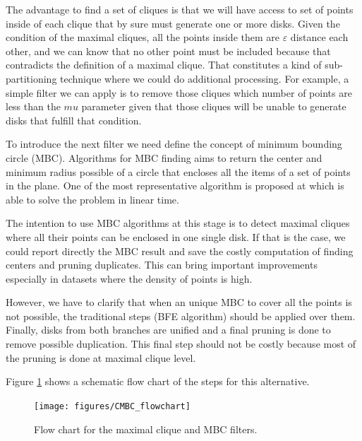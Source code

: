 \begin{itemize}
The advantage to find a set of cliques is that we will have access to set of points inside of each clique that by sure must generate one or more disks.  Given the condition of the maximal cliques, all the points inside them are $\varepsilon$ distance each other, and we can know that no other point must be included because that contradicts the definition of a maximal clique.  That constitutes a kind of sub-partitioning technique where we could do additional processing. For example, a simple filter we can apply is to remove those cliques which number of points are less than the $mu$ parameter given that those cliques will be unable to generate disks that fulfill that condition.

To introduce the next filter we need define the concept of minimum bounding circle (MBC).  Algorithms for MBC finding aims to return the center and minimum radius possible of a circle that encloses all the items of a set of points in the plane.  One of the most representative algorithm is proposed at \cite{welzl_mbc_1991} which is able to solve the problem in linear time.

The intention to use MBC algorithms at this stage is to detect maximal cliques where all their points can be enclosed in one single disk.  If that is the case, we could report directly the MBC result and save the costly computation of finding centers and pruning duplicates.  This can bring important improvements especially in datasets where the density of points is high. 

However, we have to clarify that when an unique MBC to cover all the points is not possible, the traditional steps (BFE algorithm) should be applied over them.  Finally, disks from both branches are unified and a final pruning is done to remove possible duplication.  This final step should not be costly because most of the pruning is done at maximal clique level.

Figure \ref{fig:CMBC_flowchart} shows a schematic flow chart of the steps for this alternative.

\begin{figure}
    \centering
    \texttt{[image: figures/CMBC\_flowchart]}
    \caption{Flow chart for the maximal clique and MBC filters.}\label{fig:CMBC_flowchart}
\end{figure}

\end{itemize}
